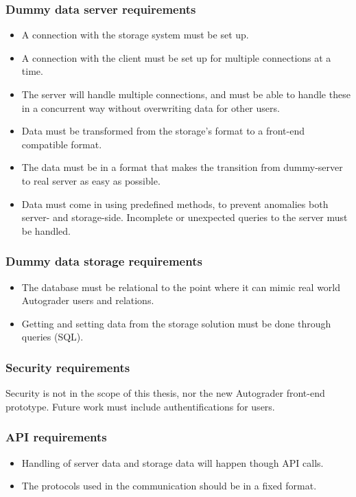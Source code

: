 \subsubsection{Dummy data server requirements}
\begin{itemize}
\item A connection with the storage system must be set up.
\item A connection with the client must be set up for multiple connections at a time.
\item The server will handle multiple connections, and must be able to handle these in a concurrent way without overwriting data for other users.
\item Data must be transformed from the storage's format to a front-end compatible format.
\item The data must be in a format that makes the transition from dummy-server to real server as easy as possible.
\item Data must come in using predefined methods, to prevent anomalies both server- and storage-side. Incomplete or unexpected queries to the server must be handled.
\end{itemize}

\subsubsection{Dummy data storage requirements}
\begin{itemize}
\item The database must be relational to the point where it can mimic real world Autograder users and relations.
\item Getting and setting data from the storage solution must be done through queries (SQL).
\end{itemize}

\subsubsection{Security requirements}
Security is not in the scope of this thesis, nor the new Autograder front-end prototype. Future work must include authentifications for users.

\subsubsection{API requirements}
\begin{itemize}
\item Handling of server data and storage data will happen though API calls.
\item The protocols used in the communication should be in a fixed format.
\end{itemize}

